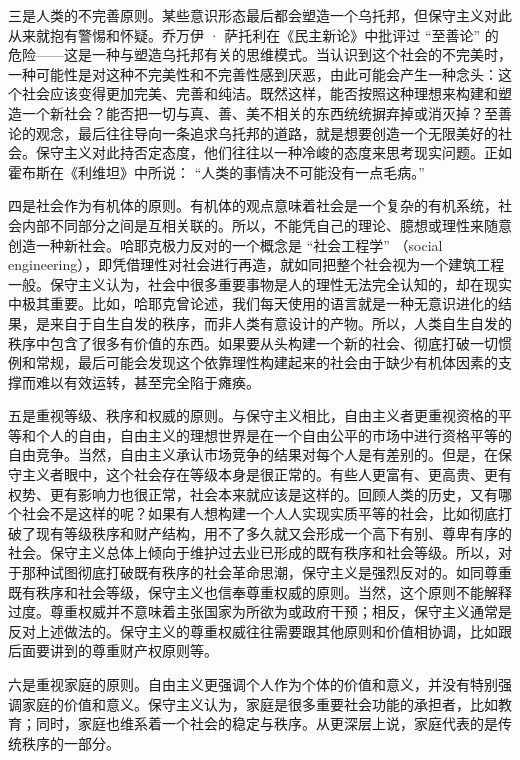 三是人类的不完善原则。某些意识形态最后都会塑造一个乌托邦，但保守主义对此从来就抱有警惕和怀疑。乔万伊 · 萨托利在《民主新论》中批评过 “至善论” 的危险——这是一种与塑造乌托邦有关的思维模式。当认识到这个社会的不完美时，一种可能性是对这种不完美性和不完善性感到厌恶，由此可能会产生一种念头：这个社会应该变得更加完美、完善和纯洁。既然这样，能否按照这种理想来构建和塑造一个新社会？能否把一切与真、善、美不相关的东西统统摒弃掉或消灭掉？至善论的观念，最后往往导向一条追求乌托邦的道路，就是想要创造一个无限美好的社会。保守主义对此持否定态度，他们往往以一种冷峻的态度来思考现实问题。正如霍布斯在《利维坦》中所说： “人类的事情决不可能没有一点毛病。” 

四是社会作为有机体的原则。有机体的观点意味着社会是一个复杂的有机系统，社会内部不同部分之间是互相关联的。所以，不能凭自己的理论、臆想或理性来随意创造一种新社会。哈耶克极力反对的一个概念是 “社会工程学” （social engineering），即凭借理性对社会进行再造，就如同把整个社会视为一个建筑工程一般。保守主义认为，社会中很多重要事物是人的理性无法完全认知的，却在现实中极其重要。比如，哈耶克曾论述，我们每天使用的语言就是一种无意识进化的结果，是来自于自生自发的秩序，而非人类有意设计的产物。所以，人类自生自发的秩序中包含了很多有价值的东西。如果要从头构建一个新的社会、彻底打破一切惯例和常规，最后可能会发现这个依靠理性构建起来的社会由于缺少有机体因素的支撑而难以有效运转，甚至完全陷于瘫痪。

五是重视等级、秩序和权威的原则。与保守主义相比，自由主义者更重视资格的平等和个人的自由，自由主义的理想世界是在一个自由公平的市场中进行资格平等的自由竞争。当然，自由主义承认市场竞争的结果对每个人是有差别的。但是，在保守主义者眼中，这个社会存在等级本身是很正常的。有些人更富有、更高贵、更有权势、更有影响力也很正常，社会本来就应该是这样的。回顾人类的历史，又有哪个社会不是这样的呢？如果有人想构建一个人人实现实质平等的社会，比如彻底打破了现有等级秩序和财产结构，用不了多久就又会形成一个高下有别、尊卑有序的社会。保守主义总体上倾向于维护过去业已形成的既有秩序和社会等级。所以，对于那种试图彻底打破既有秩序的社会革命思潮，保守主义是强烈反对的。如同尊重既有秩序和社会等级，保守主义也信奉尊重权威的原则。当然，这个原则不能解释过度。尊重权威并不意味着主张国家为所欲为或政府干预；相反，保守主义通常是反对上述做法的。保守主义的尊重权威往往需要跟其他原则和价值相协调，比如跟后面要讲到的尊重财产权原则等。

六是重视家庭的原则。自由主义更强调个人作为个体的价值和意义，并没有特别强调家庭的价值和意义。保守主义认为，家庭是很多重要社会功能的承担者，比如教育；同时，家庭也维系着一个社会的稳定与秩序。从更深层上说，家庭代表的是传统秩序的一部分。

